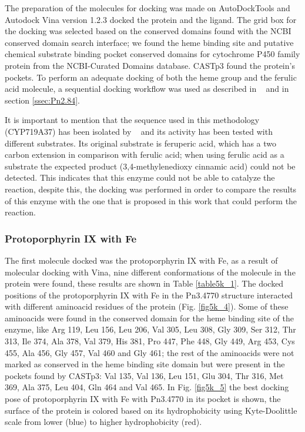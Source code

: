 \documentclass[12pt]{article}
\newcommand{\textcite}[1]{\citeauthor{#1}~\citeyear{#1}}
\begin{document}
	The preparation of the molecules for docking was made on AutoDockTools and Autodock Vina version 1.2.3 docked the protein and the ligand. \cite{adt,vina,vina_2} The grid box for the docking was selected based on the conserved domains found with the NCBI conserved domain search interface; we found the heme binding site and putative chemical substrate binding pocket conserved domains for cytochrome P450 family protein from the NCBI-Curated Domains database. \cite{cdd,cdd_2}  CASTp3 found the protein's pockets. \cite{castp} To perform an adequate docking of both the heme group and the ferulic acid molecule, a sequential docking workflow was used as described in \textcite{sequential} and in section \ref{ssec:Pn2.84}.
	
	It is important to mention that the sequence used in this methodology (CYP719A37) has been isolated by \textcite{methylenedioxy} and its activity has been tested with different substrates. Its original substrate is feruperic acid, which has a two carbon extension in comparison with ferulic acid; when using ferulic acid as a substrate the expected product (3,4-methylenedioxy cinnamic acid) could not be detected. This indicates that this enzyme could not be able to catalyze the reaction, despite this, the docking was performed in order to compare the results of this enzyme with the one that is proposed in this work that could perform the reaction. 
	
	\subsubsection{Protoporphyrin IX with Fe}
	
	The first molecule docked was the protoporphyrin IX with Fe, as a result of molecular docking with Vina, nine different conformations of the molecule in the protein were found, these results are shown in Table \ref{table5k_1}. The docked positions of the protoporphyrin IX with Fe in the Pn3.4770 structure interacted with different aminoacid residues of the protein (Fig. \ref{fig5k_4}). Some of these aminoacids were found in the conserved domain for the heme binding site of the enzyme, like Arg 119, Leu 156, Leu 206, Val 305, Leu 308, Gly 309, Ser 312, Thr 313, Ile 374, Ala 378, Val 379, His 381, Pro 447, Phe 448, Gly 449, Arg 453, Cys 455, Ala 456, Gly 457, Val 460 and Gly 461; the rest of the aminoacids were not marked as conserved in the heme binding site domain but were present in the pockets found by CASTp3: Val 135, Val 136, Leu 151, Glu 304, Thr 316, Met 369, Ala 375, Leu 404, Gln 464 and Val 465. In Fig. \ref{fig5k_5} the best docking pose of protoporphyrin IX with Fe with Pn3.4770 in its pocket is shown, the surface of the protein is colored based on its hydrophobicity using Kyte-Doolittle scale from lower (blue) to higher hydrophobicity (red).
	
\end{document}
